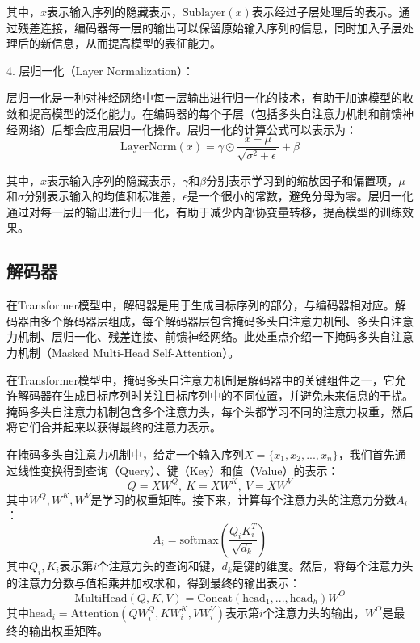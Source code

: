 其中，$x$表示输入序列的隐藏表示，$\text{Sublayer}(x)$表示经过子层处理后的表示。通过残差连接，编码器每一层的输出可以保留原始输入序列的信息，同时加入子层处理后的新信息，从而提高模型的表征能力。

4. 层归一化（Layer Normalization）：

层归一化是一种对神经网络中每一层输出进行归一化的技术，有助于加速模型的收敛和提高模型的泛化能力。在编码器的每个子层（包括多头自注意力机制和前馈神经网络）后都会应用层归一化操作。层归一化的计算公式可以表示为：
\begin{equation}
	\text{LayerNorm}(x) = \gamma \odot \frac{x - \mu}{\sqrt{\sigma^2 + \epsilon}} + \beta
\end{equation}


其中，$x$表示输入序列的隐藏表示，$\gamma$和$\beta$分别表示学习到的缩放因子和偏置项，$\mu$和$\sigma$分别表示输入的均值和标准差，$\epsilon$是一个很小的常数，避免分母为零。层归一化通过对每一层的输出进行归一化，有助于减少内部协变量转移，提高模型的训练效果。

\subsection{解码器}
在Transformer模型中，解码器是用于生成目标序列的部分，与编码器相对应。解码器由多个解码器层组成，每个解码器层包含掩码多头自注意力机制、多头自注意力机制、层归一化、残差连接、前馈神经网络。此处重点介绍一下掩码多头自注意力机制（Masked Multi-Head Self-Attention）。

在Transformer模型中，掩码多头自注意力机制是解码器中的关键组件之一，它允许解码器在生成目标序列时关注目标序列中的不同位置，并避免未来信息的干扰。掩码多头自注意力机制包含多个注意力头，每个头都学习不同的注意力权重，然后将它们合并起来以获得最终的注意力表示。

在掩码多头自注意力机制中，给定一个输入序列$X = \{x_1, x_2, ..., x_n\}$，我们首先通过线性变换得到查询（Query）、键（Key）和值（Value）的表示：
\begin{equation}
Q = XW^Q, \ K = XW^K, \ V = XW^V
\end{equation}
其中$W^Q, W^K, W^V$是学习的权重矩阵。接下来，计算每个注意力头的注意力分数$A_i$：
\begin{equation}
A_i = \text{softmax}(\frac{Q_iK_i^T}{\sqrt{d_k}})
\end{equation}
其中$Q_i, K_i$表示第$i$个注意力头的查询和键，$d_k$是键的维度。然后，将每个注意力头的注意力分数与值相乘并加权求和，得到最终的输出表示：
\begin{equation}
\text{MultiHead}(Q, K, V) = \text{Concat}(\text{head}_1, ..., \text{head}_h)W^O
\end{equation}
其中$\text{head}_i = \text{Attention}(QW_i^Q, KW_i^K, VW_i^V)$表示第$i$个注意力头的输出，$W^O$是最终的输出权重矩阵。

